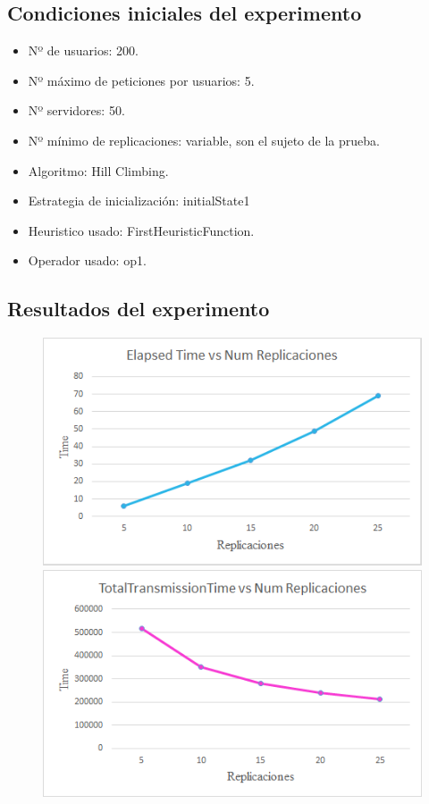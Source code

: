 \documentclass[a4paper,10pt]{report}
\begin{document}
		\subsection*{Condiciones iniciales del experimento}
		\begin{itemize}
		    \item Nº de usuarios: 200.
    		\item Nº máximo de peticiones por usuarios: 5.
    		\item Nº servidores: 50.
    		\item Nº mínimo de replicaciones: variable, son el sujeto de la prueba.
    		\item Algoritmo: Hill Climbing.
    		\item Estrategia de inicialización: initialState1
    		\item Heuristico usado: FirstHeuristicFunction.
    		\item Operador usado: op1.
		\end{itemize}

		\subsection*{Resultados del experimento}
		
		\begin{figure}[H]
          \includegraphics[width=\linewidth]{images/Elapsed Time vs Num Replicaciones.png}
        \endminipage\hfill
          \includegraphics[width=\linewidth]{images/TotalTime vs Num Replicaciones.png}
        \endminipage
        \end{figure}
		
\end{document}

